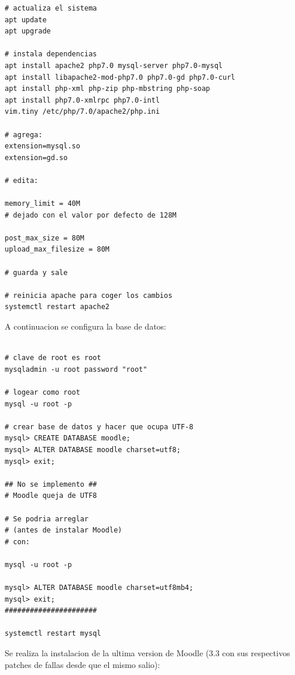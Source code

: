 \begin{lstlisting}
# actualiza el sistema
apt update
apt upgrade

# instala dependencias
apt install apache2 php7.0 mysql-server php7.0-mysql
apt install libapache2-mod-php7.0 php7.0-gd php7.0-curl
apt install php-xml php-zip php-mbstring php-soap
apt install php7.0-xmlrpc php7.0-intl
vim.tiny /etc/php/7.0/apache2/php.ini

# agrega:
extension=mysql.so 
extension=gd.so

# edita:

memory_limit = 40M
# dejado con el valor por defecto de 128M

post_max_size = 80M
upload_max_filesize = 80M

# guarda y sale

# reinicia apache para coger los cambios
systemctl restart apache2

\end{lstlisting}

A continuacion se configura la base de datos:

\begin{lstlisting}

# clave de root es root
mysqladmin -u root password "root"

# logear como root
mysql -u root -p

# crear base de datos y hacer que ocupa UTF-8
mysql> CREATE DATABASE moodle;
mysql> ALTER DATABASE moodle charset=utf8;
mysql> exit;

## No se implemento ##
# Moodle queja de UTF8

# Se podria arreglar
# (antes de instalar Moodle)
# con:

mysql -u root -p

mysql> ALTER DATABASE moodle charset=utf8mb4;
mysql> exit;
######################

systemctl restart mysql

\end{lstlisting}

Se realiza la instalacion de la ultima version de Moodle (3.3 con sus respectivos patches de fallas desde que el mismo salio):

